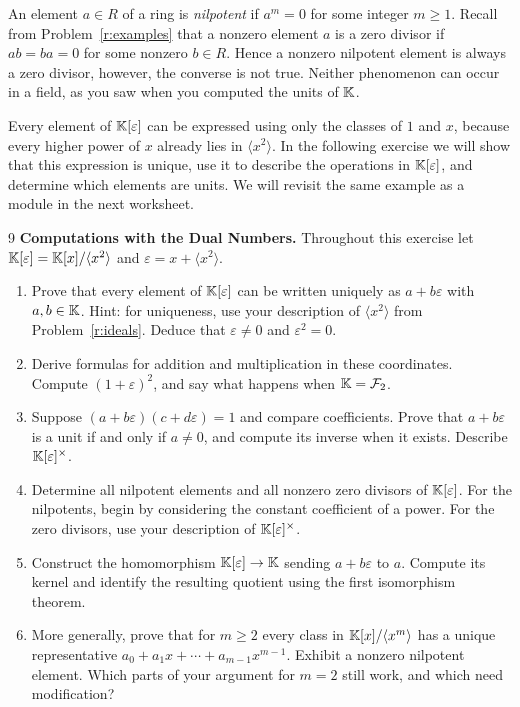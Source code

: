 \documentclass[Notebook.tex]{subfiles}
\begin{document}
An element $a\in R$ of a ring is \emph{nilpotent} if $a^m=0$ for some integer $m\geq1$. Recall from Problem~\ref{r:examples} that a nonzero element $a$ is a zero divisor if $ab=ba=0$ for some nonzero $b \in R$. Hence a nonzero nilpotent element is always a zero divisor, however, the converse is not true. Neither phenomenon can occur in a field, as you saw when you computed the units of $\mathbb K$.

Every element of $\mathbb K[\varepsilon]$ can be expressed using only the classes of $1$ and $x$, because every higher power of $x$ already lies in $\langle x^2\rangle$. In the following exercise we will show that this expression is unique, use it to describe the operations in $\mathbb K[\varepsilon]$, and determine which elements are units. We will revisit the same example as a module in the next worksheet.

\hrulefill

\begin{problem}{9}\label{r:dual}
	\textbf{Computations with the Dual Numbers.} Throughout this exercise let $\mathbb K[\varepsilon]=\mathbb K[x]/\langle x^2\rangle$ and $\varepsilon=x+\langle x^2\rangle$.
	\begin{enumerate}[label=(\alph*),ref=\theenumi\alph*]
		\item Prove that every element of $\mathbb K[\varepsilon]$ can be written uniquely as $a+b\varepsilon$ with $a,b\in\mathbb K$. Hint: for uniqueness, use your description of $\langle x^2\rangle$ from Problem~\ref{r:ideals}. Deduce that $\varepsilon\ne0$ and $\varepsilon^2=0$.
		\item Derive formulas for addition and multiplication in these coordinates. Compute $(1+\varepsilon)^2$, and say what happens when $\mathbb K=\mathcal{F}_2$.
		\item Suppose $(a+b\varepsilon)(c+d\varepsilon)=1$ and compare coefficients. Prove that $a+b\varepsilon$ is a unit if and only if $a\ne0$, and compute its inverse when it exists. Describe $\mathbb K[\varepsilon]^\times$.
		\item Determine all nilpotent elements and all nonzero zero divisors of $\mathbb K[\varepsilon]$. For the nilpotents, begin by considering the constant coefficient of a power. For the zero divisors, use your description of $\mathbb K[\varepsilon]^\times$.
		\item Construct the homomorphism $\mathbb K[\varepsilon]\to\mathbb K$ sending $a+b\varepsilon$ to $a$. Compute its kernel and identify the resulting quotient using the first isomorphism theorem.
		\item More generally, prove that for $m\geq2$ every class in $\mathbb K[x]/\langle x^m\rangle$ has a unique representative $a_0+a_1x+\cdots+a_{m-1}x^{m-1}$. Exhibit a nonzero nilpotent element. Which parts of your argument for $m=2$ still work, and which need modification?
	\end{enumerate}
\end{problem}
\end{document}
